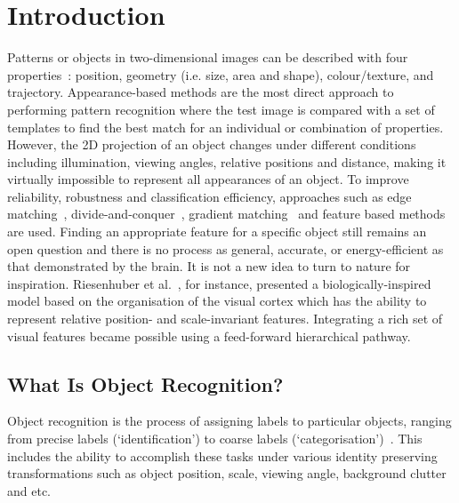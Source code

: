 \chapter{Introduction}
\label{cha:intro}
Patterns or objects in two-dimensional images can be described with four properties~\cite{wysoski2008fast}: position, geometry (i.e. size, area and shape), colour/texture, and trajectory. 
Appearance-based methods are the most direct approach to performing pattern recognition where the test image is compared with a set of templates to find the best match for an individual or combination of properties. 
However, the 2D projection of an object changes under different conditions including illumination, viewing angles, relative positions and distance, making it virtually impossible to represent all appearances of an object. 
To improve reliability, robustness and classification efficiency, approaches such as edge matching~\cite{canny1986computational}, divide-and-conquer~\cite{toygar2004multiple}, gradient matching~\cite{wei2006robust} and feature based methods~\cite{lowe2004distinctive, bay2008speeded} are used.
Finding an appropriate feature for a specific object still remains an open question and there is no process as general, accurate, or energy-efficient as that demonstrated by the brain.
It is not a new idea to turn to nature for inspiration. 
Riesenhuber et al.~\cite{riesenhuber1999hierarchical}, for instance, presented a biologically-inspired model based on the organisation of the visual cortex which has the ability to represent relative position- and scale-invariant features.
Integrating a rich set of visual features became possible using a feed-forward hierarchical pathway. 

\section{What Is Object Recognition?}
\label{sec:aim}
Object recognition is the process of assigning labels to particular objects, ranging from precise labels (`identification') to coarse labels (`categorisation')~\cite{dicarlo2012does}.
This includes the ability to accomplish these tasks under various identity preserving transformations such as object position, scale, viewing angle, background clutter and etc.

